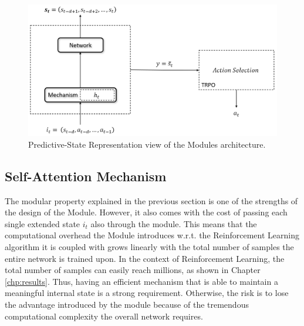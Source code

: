             \begin{figure}[!t]
                        \centering
                        \includegraphics[width=15cm, keepaspectratio]{images/module/psr_view.png}
                        \caption{Predictive-State Representation view of the Modules architecture.}
                        \label{fig:module_psr_view}
            \end{figure}
            
        \subsection{Self-Attention Mechanism}
            The modular property explained in the previous section is one of the strengths of the design of the Module. However, it also comes with the cost of passing each single extended state $i_t$ also through the module. This means that the computational overhead the Module introduces w.r.t. the Reinforcement Learning algorithm it is coupled with grows linearly with the total number of samples the entire network is trained upon. In the context of Reinforcement Learning, the total number of samples can easily reach millions, as shown in Chapter \ref{chp:results}. Thus, having an efficient mechanism that is able to maintain a meaningful internal state is a strong requirement. Otherwise, the risk is to lose the advantage introduced by the module because of the tremendous computational complexity the overall network requires. \newline
            
